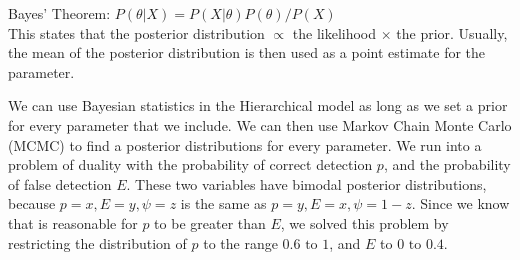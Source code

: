 \documentclass{article}
\begin{document}
	   	Bayes' Theorem: \(P(\theta|X) = P(X|\theta)P(\theta) / P(X)\) \\

	This states that the posterior distribution \( \propto \) the likelihood 
\(\times\) the prior.
	Usually, the mean of the posterior distribution is then used as a point 
estimate for the parameter.  
  	
	We can use Bayesian statistics in the Hierarchical model as long as we set a
prior for every parameter that we include.  We can then use Markov Chain Monte 
Carlo (MCMC) to find a posterior distributions for every parameter.  We run into 
a problem of duality with the probability of correct detection \(p\), and the 
probability of false detection \(E\).  These two variables have bimodal posterior
distributions, because \(p = x, E = y, \psi = z\) is the same as \(p = y, E = x, 
\psi = 1 - z\).  Since we know that is reasonable for \(p\) to be greater than \(E\),
we solved this problem by restricting the distribution of \(p\) to the range
\(0.6 \text{ to } 1\), and \(E\) to \(0 \text{ to } 0.4\).  
\end{document}
